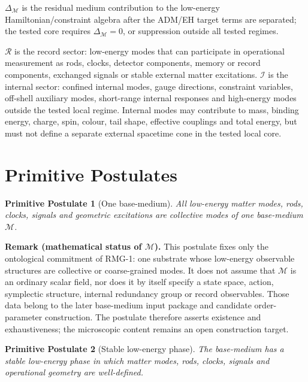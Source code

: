 \documentclass[11pt]{article}
\newtheorem{postulate}{Primitive Postulate}
\begin{document}
$\Delta_{\mathcal M}$ is the residual medium contribution to the low-energy
Hamiltonian/constraint algebra after the ADM/EH target terms are separated;
the tested core requires $\Delta_{\mathcal M}=0$, or suppression outside all
tested regimes.

$\mathcal R$ is the record sector: low-energy modes that can participate in
operational measurement as rods, clocks, detector components, memory or
record components, exchanged signals or stable external matter excitations.
$\mathcal I$ is the internal sector: confined internal modes, gauge
directions, constraint variables, off-shell auxiliary modes, short-range
internal responses and high-energy modes outside the tested local regime.
Internal modes may contribute to mass, binding energy, charge, spin, colour,
tail shape, effective couplings and total energy, but must not define a
separate external spacetime cone in the tested local core.

\section{Primitive Postulates}

\begin{postulate}[One base-medium]
All low-energy matter modes, rods, clocks, signals and geometric excitations are
collective modes of one base-medium $\mathcal M$.
\end{postulate}

\medskip\noindent\textbf{Remark (mathematical status of \(\mathcal M\)).}
This postulate fixes only the ontological commitment of RMG-1: one substrate
whose low-energy observable structures are collective or coarse-grained modes.
It does not assume that \(\mathcal M\) is an ordinary scalar field, nor does it
by itself specify a state space, action, symplectic structure, internal
redundancy group or record observables.  Those data belong to the later
base-medium input package and candidate order-parameter construction.  The
postulate therefore asserts existence and exhaustiveness; the microscopic
content remains an open construction target.

\begin{postulate}[Stable low-energy phase]
The base-medium has a stable low-energy phase in which matter modes, rods,
clocks, signals and operational geometry are well-defined.
\end{postulate}
\end{document}
